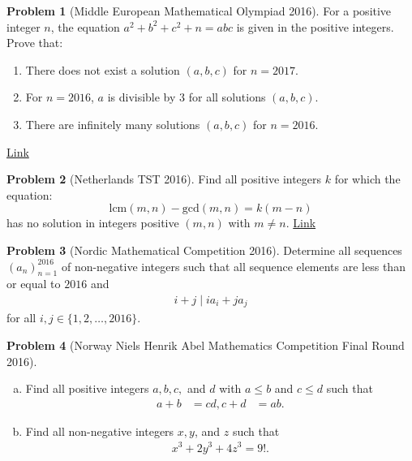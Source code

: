 \documentclass[]{article}
\theoremstyle{definition}
\newtheorem{problem}{Problem}
\begin{document}
\begin{problem}[Middle European Mathematical Olympiad 2016]
	For a positive integer $n$, the equation $a^2 + b^2 + c^2 + n = abc$ is given in the positive integers.
	Prove that:
		\begin{enumerate}
			\item There does not exist a solution $(a, b, c)$ for $n = 2017$.
			\item For $n = 2016$, $a$ is divisible by $3$ for all solutions $(a, b, c)$.
			\item There are infinitely many solutions $(a, b, c)$ for $n = 2016$.
		\end{enumerate}
	\flushright \href{http://artofproblemsolving.com/community/c6h1295948p6876344}{Link}
\end{problem}



\begin{problem}[Netherlands TST 2016]
	Find all positive integers $k$ for which the equation: $$ \text{lcm}(m,n)-\text{gcd}(m,n)=k(m-n)$$has no solution in integers positive $(m,n)$ with $m\neq n$. \hfill \href{http://artofproblemsolving.com/community/c6h1309257p7009221}{Link}
\end{problem}


\begin{problem}[Nordic Mathematical Competition 2016]
	Determine all sequences $(a_n)_{n=1}^{2016}$ of non-negative integers such that all sequence elements are less than or equal to $2016$ and
		\begin{align*}
			i+j \mid ia_i + ja_j
		\end{align*}
	for all $i,j \in \{1, 2, \dots, 2016\}$.
\end{problem}

\begin{problem}[Norway Niels Henrik Abel Mathematics Competition Final Round 2016]
	\begin{enumerate}[(a)]
		\item Find all positive integers $a, b, c,$ and $d$ with $a \leq b$ and $c \leq d$ such that
			\begin{align*}
				a + b &= cd,
				c + d &= ab.
			\end{align*}
		\item Find all non-negative integers $x, y$, and $z$ such that
			\begin{align*}
				x^3 + 2y^3 + 4z^3 = 9!.
			\end{align*}
	\end{enumerate}
\end{problem}
\end{document}

